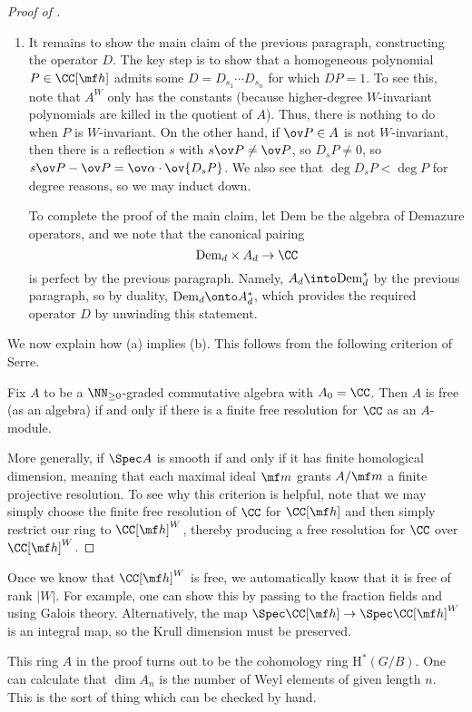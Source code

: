 \documentclass[../notes.tex]{subfiles}
\begin{document}
\begin{proof}[Proof of ]
\begin{enumerate}
		\item It remains to show the main claim of the previous paragraph, constructing the operator $D$. The key step is to show that a homogeneous polynomial $P\in\CC[\mf h]$ admits some $D=D_{s_1}\cdots D_{s_n}$ for which $DP=1$. To see this, note that $A^W$ only has the constants (because higher-degree $W$-invariant polynomials are killed in the quotient of $A$). Thus, there is nothing to do when $P$ is $W$-invariant. On the other hand, if $\ov P\in A$ is not $W$-invariant, then there is a reflection $s$ with $s\ov P\ne\ov P$, so $D_sP\ne0$, so $s\ov P-\ov P=\ov\alpha\cdot\ov{D_sP}$. We also see that $\deg D_sP<\deg P$ for degree reasons, so we may induct down.

		To complete the proof of the main claim, let $\mathrm{Dem}$ be the algebra of Demazure operators, and we note that the canonical pairing
		\[\mathrm{Dem}_d\times A_d\to\CC\]
		is perfect by the previous paragraph. Namely, $A_d\into\mathrm{Dem}_d^*$ by the previous paragraph, so by duality, $\mathrm{Dem}_d\onto A_d^*$, which provides the required operator $D$ by unwinding this statement.
	\end{enumerate}
	We now explain how (a) implies (b). This follows from the following criterion of Serre.
	\begin{proposition}[Serre] \label{prop:serre-criterion}
		Fix $A$ to be a $\NN_{\ge0}$-graded commutative algebra with $A_0=\CC$. Then $A$ is free (as an algebra) if and only if there is a finite free resolution for $\CC$ as an $A$-module.
	\end{proposition}
	More generally, if $\Spec A$ is smooth if and only if it has finite homological dimension, meaning that each maximal ideal $\mf m$ grants $A/\mf m$ a finite projective resolution. To see why this criterion is helpful, note that we may simply choose the finite free resolution of $\CC$ for $\CC[\mf h]$ and then simply restrict our ring to $\CC[\mf h]^W$, thereby producing a free resolution for $\CC$ over $\CC[\mf h]^W$.
\end{proof}
\begin{remark}
	Once we know that $\CC[\mf h]^W$ is free, we automatically know that it is free of rank $\left|W\right|$. For example, one can show this by passing to the fraction fields and using Galois theory. Alternatively, the map $\Spec\CC[\mf h]\to\Spec\CC[\mf h]^W$ is an integral map, so the Krull dimension must be preserved.
\end{remark}
\begin{remark}
	This ring $A$ in the proof turns out to be the cohomology ring $\mathrm H^*(G/B)$. One can calculate that $\dim A_n$ is the number of Weyl elements of given length $n$. This is the sort of thing which can be checked by hand.
\end{remark}
\end{document}
